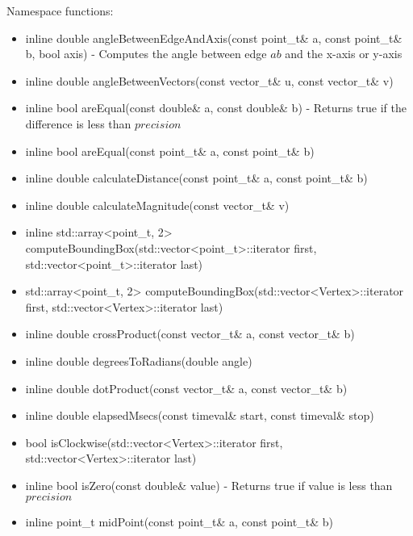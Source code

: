 \documentclass[manuscript, screen]{acmart}
\begin{document}
Namespace functions:
\begin{itemize}
\item inline double angleBetweenEdgeAndAxis(const point\_t\& a, const point\_t\& b, bool axis) - Computes the angle between edge $ab$ and the x-axis or y-axis

\item inline double angleBetweenVectors(const vector\_t\& u, const vector\_t\& v)

\item inline bool areEqual(const double\& a, const double\& b) - Returns true if the difference is less than $precision$

\item inline bool areEqual(const point\_t\& a, const point\_t\& b)

\item inline double calculateDistance(const point\_t\& a, const point\_t\& b)

\item inline double calculateMagnitude(const vector\_t\& v)

\item inline std::array<point\_t, 2> computeBoundingBox(std::vector<point\_t>::iterator first, std::vector<point\_t>::iterator last)

\item std::array<point\_t, 2> computeBoundingBox(std::vector<Vertex>::iterator first, std::vector<Vertex>::iterator last)

\item inline double crossProduct(const vector\_t\& a, const vector\_t\& b)

\item inline double degreesToRadians(double angle)

\item inline double dotProduct(const vector\_t\& a, const vector\_t\& b)

\item inline double elapsedMsecs(const timeval\& start, const timeval\& stop)

\item bool isClockwise(std::vector<Vertex>::iterator first, std::vector<Vertex>::iterator last)

\item inline bool isZero(const double\& value) - Returns true if value is less than $precision$

\item inline point\_t midPoint(const point\_t\& a, const point\_t\& b) 


\end{itemize}
\end{document}
